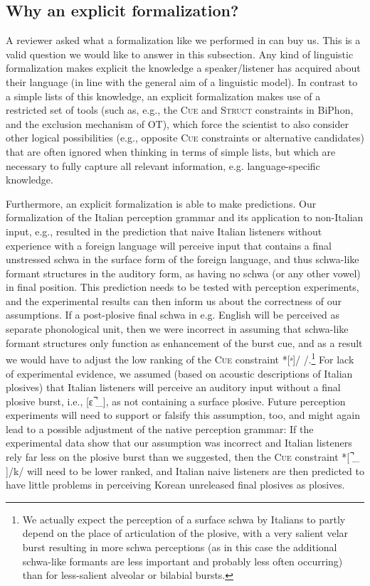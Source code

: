 \documentclass[output=paper,colorlinks,citecolor=brown]{langscibook}
\begin{document}
\subsection{Why an explicit formalization?}
A reviewer asked what a formalization like we performed in  can buy us. This is a valid question we would like to answer in this subsection. Any kind of linguistic formalization makes explicit the knowledge a speaker/listener has acquired about their language (in line with the general aim of a linguistic model). In contrast to a simple lists of this knowledge, an explicit formalization makes use of a restricted set of tools (such as, e.g., the C\textsc{ue} and S\textsc{truct} constraints in BiPhon, and the exclusion mechanism of OT), which force the scientist to also consider other logical possibilities (e.g., opposite C\textsc{ue} constraints or alternative candidates) that are often ignored when thinking in terms of simple lists, but which are necessary to fully capture all relevant information, e.g. language-specific knowledge.

Furthermore,  an explicit formalization is able to make predictions. Our formalization of the Italian perception grammar and its application to non-Italian input, e.g., resulted in the prediction that naive Italian listeners without experience with a foreign language will perceive input that contains a final unstressed schwa in the surface form of the foreign language, and thus schwa-like formant structures in the auditory form, as having no schwa (or any other vowel) in final position. This prediction needs to be tested with perception experiments, and the experimental results can then inform us about the correctness of our assumptions. If a post-plosive final schwa in e.g. English will be perceived as separate phonological unit, then we were incorrect in assuming that schwa-like formant structures only function as enhancement of the burst cue, and as a result we would have to adjust the low ranking of the C\textsc{ue} constraint *[ᵊ]/  /.\footnote{We actually expect the perception of a surface schwa by Italians to partly depend on the place of articulation of the plosive, with a very salient velar burst resulting in more schwa perceptions (as in this case the additional schwa-like formants are less important and probably less often occurring) than for less-salient alveolar or bilabial bursts.}
For lack of experimental evidence, we assumed (based on acoustic descriptions of Italian plosives) that Italian listeners will perceive an auditory input without a final plosive burst, i.e., [ɛ  ̚\_], as not containing a surface plosive. Future perception experiments will need to support or falsify this assumption, too, and might again lead to a possible adjustment of the native perception grammar: If the experimental data show that our assumption was incorrect and Italian listeners rely far less on the plosive burst than we suggested, then the C\textsc{ue} constraint *[ ̚\_ ]/k/ will need to be lower ranked, and Italian naive listeners are then predicted to have little problems in perceiving Korean unreleased final plosives as plosives.
\end{document}
